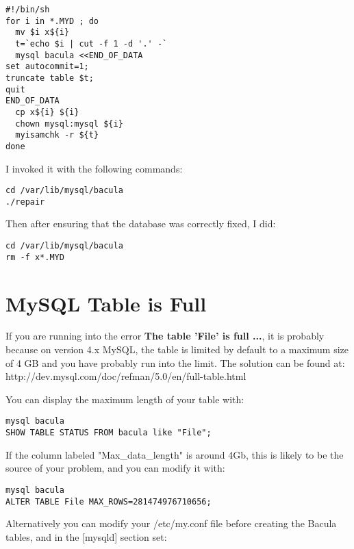 \footnotesize
\begin{verbatim}
#!/bin/sh
for i in *.MYD ; do
  mv $i x${i}
  t=`echo $i | cut -f 1 -d '.' -`
  mysql bacula <<END_OF_DATA
set autocommit=1;
truncate table $t;
quit
END_OF_DATA
  cp x${i} ${i}
  chown mysql:mysql ${i}
  myisamchk -r ${t}
done
\end{verbatim}
\normalsize

I invoked it with the following commands:

\footnotesize
\begin{verbatim}
cd /var/lib/mysql/bacula
./repair
\end{verbatim}
\normalsize

Then after ensuring that the database was correctly fixed, I did:
\footnotesize
\begin{verbatim}
cd /var/lib/mysql/bacula
rm -f x*.MYD
\end{verbatim}
\normalsize

\section{MySQL Table is Full}

If you are running into the error {\bf The table 'File' is full ...}, 
it is probably because on version 4.x MySQL, the table is limited by   
default to a maximum size of 4 GB and you have probably run into
the limit. The solution can be found at:
{http://dev.mysql.com/doc/refman/5.0/en/full-table.html}

You can display the maximum length of your table with:

\footnotesize
\begin{verbatim}
mysql bacula
SHOW TABLE STATUS FROM bacula like "File";
\end{verbatim}
\normalsize

If the column labeled "Max\_data\_length" is around 4Gb, this is likely
to be the source of your problem, and you can modify it with:

\footnotesize
\begin{verbatim}
mysql bacula
ALTER TABLE File MAX_ROWS=281474976710656;
\end{verbatim}
\normalsize

Alternatively you can modify your /etc/my.conf file before creating the
Bacula tables, and in the [mysqld] section set:

